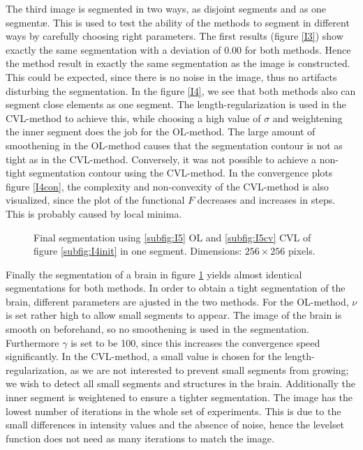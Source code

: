 The third image is segmented in two ways, as disjoint segments and as one segmentæ. This is used to test the ability of the methods to segment in different ways by carefully choosing right parameters. The first results (figure \ref{I3}) show exactly the same segmentation with a deviation of $0.00$ for both methods. Hence the method result in exactly the same segmentation as the image is constructed. This could be expected, since there is no noise in the image, thus no artifacts disturbing the segmentation. In the figure \ref{I4}, we see that both methods also can segment close elements as one segment. The length-regularization is used in the CVL-method to achieve this, while choosing a high value of $\sigma$ and weightening the inner segment does the job for the OL-method. The large amount of smoothening in the OL-method causes that the segmentation contour is not as tight as in the CVL-method. Conversely, it was not possible to achieve a non-tight segmentation contour using the CVL-method. In the convergence plots figure \ref{I4con}, the complexity and non-convexity of the CVL-method is also visualized, since the plot of the functional $F$ decreases and increases in steps. This is probably caused by local minima.\\

\begin{figure}[h]
  \centering
  \caption{Final segmentation using \ref{subfig:I5} OL and \ref{subfig:I5cv} CVL of figure \ref{subfig:I4init} in one segment. Dimensions: $256\times 256$ pixels.}\label{I5}
\end{figure}

Finally the segmentation of a brain in figure \ref{I5} yields almost identical segmentations for both methods. In order to obtain a tight segmentation of the brain, different parameters are ajusted in the two methods. For the OL-method, $\nu$ is set rather high to allow small segments to appear. The image of the brain is smooth on beforehand, so no smoothening is used in the segmentation. Furthermore $\gamma$ is set to be 100, since this increases the convergence speed significantly. In the CVL-method, a small value is chosen for the length-regularization, as we are not interested to prevent small segments from growing; we wish to detect all small segments and structures in the brain. Additionally the inner segment is weightened to ensure a tighter segmentation. The image has the lowest number of iterations in the whole set of experiments. This is due to the small differences in intensity values and the absence of noise, hence the levelset function does not need as many iterations to match the image.\\

